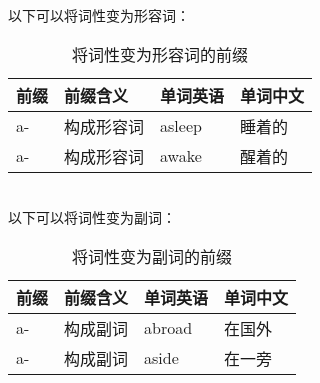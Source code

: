 \documentclass[UTF8]{ctexart}
\begin{document}
    以下可以将词性变为形容词：
    \begin{table}[h!]
        \begin{center}
            \ttfamily
            \begin{tabular}{p{40pt}|p{80pt}|p{80pt}|p{80pt}}
                \hline
                前缀&前缀含义&单词英语&单词中文\\ \hline
                a-&构成形容词&asleep&睡着的\\ \hline
                a-&构成形容词&awake&醒着的\\ \hline
            \end{tabular}
            \rmfamily
            \caption{将词性变为形容词的前缀}
        \end{center}
    \end{table}\\
    以下可以将词性变为副词：
    \begin{table}[h!]
        \begin{center}
            \ttfamily
            \begin{tabular}{p{40pt}|p{80pt}|p{80pt}|p{80pt}}
                \hline
                前缀&前缀含义&单词英语&单词中文\\ \hline
                a-&构成副词&abroad&在国外\\ \hline
                a-&构成副词&aside&在一旁\\ \hline
            \end{tabular}
            \rmfamily
            \caption{将词性变为副词的前缀}
        \end{center}
    \end{table}

\newpage
\end{document}
